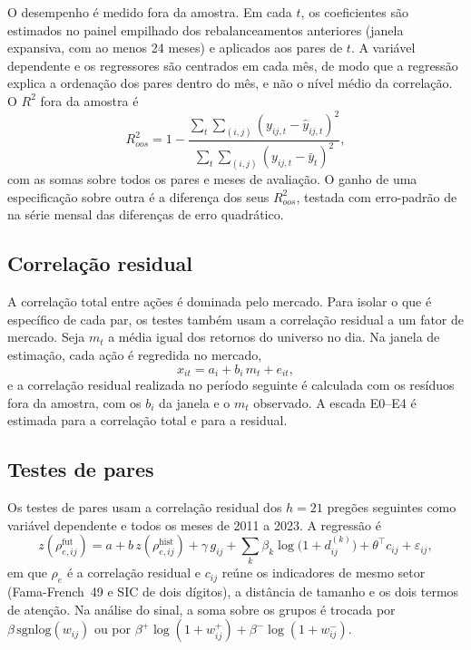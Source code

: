 O desempenho é medido fora da amostra. Em cada $t$, os coeficientes são estimados no painel empilhado
dos rebalanceamentos anteriores (janela expansiva, com ao menos 24 meses) e aplicados aos pares de $t$.
A variável dependente e os regressores são centrados em cada mês, de modo que a regressão explica a
ordenação dos pares dentro do mês, e não o nível médio da correlação. O $R^2$ fora da amostra
\citep{campbell2008} é
\[
  R^2_{oos}=1-\frac{\sum_t\sum_{(i,j)}(y_{ij,t}-\hat y_{ij,t})^2}{\sum_t\sum_{(i,j)}(y_{ij,t}-\bar y_t)^2},
\]
com as somas sobre todos os pares e meses de avaliação. O ganho de uma especificação sobre outra é a
diferença dos seus $R^2_{oos}$, testada com erro-padrão de \citet{newey1987} na série mensal das
diferenças de erro quadrático.

\subsection{Correlação residual}

A correlação total entre ações é dominada pelo mercado. Para isolar o que é específico de cada par,
os testes também usam a correlação residual a um fator de mercado. Seja $m_t$ a média igual dos
retornos do universo no dia. Na janela de estimação, cada ação é regredida no mercado,
\begin{equation}
  x_{it} = a_i + b_i\,m_t + e_{it},
  \label{eq:fator-mercado}
\end{equation}
e a correlação residual realizada no período seguinte é calculada com os resíduos fora da amostra, com
os $b_i$ da janela e o $m_t$ observado. A escada E0--E4 é estimada para a correlação total e para a
residual.

\subsection{Testes de pares}
\label{sec:testes-pares}

Os testes de pares usam a correlação residual dos $h=21$ pregões seguintes como variável dependente e
todos os meses de 2011 a 2023. A regressão é
\begin{equation}
  z(\rho^{\mathrm{fut}}_{e,ij}) = a + b\,z(\rho^{\mathrm{hist}}_{e,ij}) + \gamma\,g_{ij}
  + \sum_k \beta_k\log\bigl(1+d^{(k)}_{ij}\bigr) + \theta^\top c_{ij} + \varepsilon_{ij},
  \label{eq:pares}
\end{equation}
em que $\rho_e$ é a correlação residual e $c_{ij}$ reúne os indicadores de mesmo setor (Fama-French~49 e
SIC de dois dígitos), a distância de tamanho e os dois termos de atenção. Na análise do sinal, a soma
sobre os grupos é trocada por $\beta\,\mathrm{sgnlog}(w_{ij})$ ou por
$\beta^+\log(1+w^+_{ij})+\beta^-\log(1+w^-_{ij})$.

